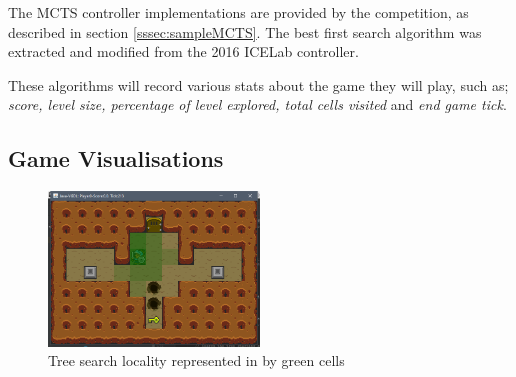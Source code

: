 \documentclass[journal]{IEEEtran}
\begin{document}
	The MCTS controller implementations are provided by the competition, as described in section \ref{sssec:sampleMCTS}.
	The best first search algorithm was extracted and modified from the 2016 ICELab controller.

	These algorithms will record various stats about the game they will play, such as; \textit{score, level size, percentage of level explored, total cells visited} and \textit{end game tick}.
	
	\subsection{Game Visualisations}
	
	\begin{figure}[h]
		   \centering
		   \includegraphics[width=0.5\textwidth]{BrFS-Locality}
		   \caption{ Tree search locality represented in by green cells }
		   \label{fig:locality}
	\end{figure}
\end{document}
